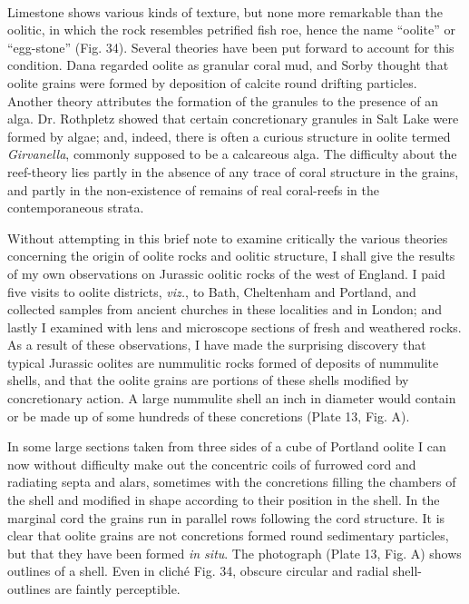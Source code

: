 \documentclass[a4paper, 12pt, oneside, landscape]{article}
\begin{document}
\paragraph{}
Limestone shows various kinds of texture, but none more remarkable than the oolitic, in which the rock resembles petrified fish roe, hence the name ``oolite'' or ``egg-stone'' (Fig. 34). Several theories have been put forward to account for this condition. Dana regarded oolite as granular coral mud, and Sorby thought that oolite grains were formed by deposition of calcite round drifting particles. Another theory attributes the formation of the granules to the presence of an alga. Dr. Rothpletz showed that certain concretionary granules in Salt Lake were formed by algae; and, indeed, there is often a curious structure in oolite termed \emph{Girvanella}, commonly supposed to be a calcareous alga. The difficulty about the reef-theory lies partly in the absence of any trace of coral structure in the grains, and partly in the non-existence of remains of real coral-reefs in the contemporaneous strata.

Without attempting in this brief note to examine critically the various theories concerning the origin of oolite rocks and oolitic structure, I shall give the results of my own observations on Jurassic oolitic rocks of the west of England. I paid five visits to oolite districts, \emph{viz.}, to Bath, Cheltenham and Portland, and collected samples from ancient churches in these localities and in London; and lastly I examined with lens and microscope sections of fresh and weathered rocks. As a result of these observations, I have made the surprising discovery that typical Jurassic oolites are nummulitic rocks formed of deposits of nummulite shells, and that the oolite grains are portions of these shells modified by concretionary action. A large nummulite shell an inch in diameter would contain or be made up of some hundreds of these concretions (Plate 13, Fig. A).

In some large sections taken from three sides of a cube of Portland oolite I can now without difficulty make out the concentric coils of furrowed cord and radiating septa and alars, sometimes with the concretions filling the chambers of the shell and modified in shape according to their position in the shell. In the marginal cord the grains run in parallel rows following the cord structure. It is clear that oolite grains are not concretions formed round sedimentary particles, but that they have been formed \emph{in situ}. The photograph (Plate 13, Fig. A) shows outlines of a shell. Even in cliché Fig. 34, obscure circular and radial shell-outlines are faintly perceptible.
\end{document}
